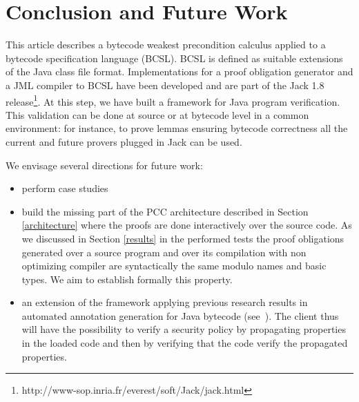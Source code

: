 \section{Conclusion and Future Work}\label{conclusion}
This article describes a bytecode weakest precondition calculus applied to a bytecode specification language (BCSL).
BCSL is defined as suitable extensions of the Java class file format.
Implementations for a proof obligation generator and a JML compiler to BCSL have been developed and are part of the Jack 1.8 release\footnote{http://www-sop.inria.fr/everest/soft/Jack/jack.html}.
At this step, we have built a framework for Java program verification. This validation can be done at source or at bytecode level in a common environment: for instance, to prove lemmas ensuring bytecode correctness all the current and future provers plugged in Jack can be used.

 We envisage several directions for future work:
\begin{itemize}
  \item perform case studies
  \item build the missing part of the PCC architecture described in Section \ref{architecture} where the proofs are done interactively over the source code.
 As we discussed in Section \ref{results} in the performed tests the 
proof obligations generated over a source program and over its compilation with non optimizing compiler are
 syntactically the same modulo names and basic types. We aim to establish formally this property.  
  \item an extension of the framework applying previous research results in automated annotation generation for
 Java bytecode (see~\cite{PBBHL}). The client thus will have the possibility to verify a security policy by
 propagating properties in the loaded code and then by verifying that the code verify the propagated properties.

\end{itemize}



